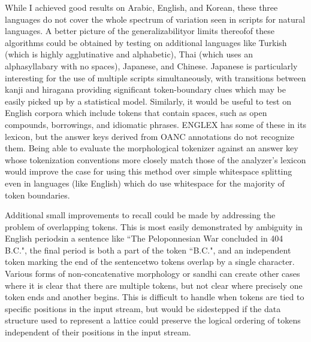 While I achieved good results on Arabic, English, and Korean, these three languages do not cover the whole spectrum of variation seen in scripts for natural languages. A better picture of the generalizability\textemdash or limits thereof\textemdash of these algorithms could be obtained by testing on additional languages like Turkish (which is highly agglutinative and alphabetic), Thai (which uses an alphasyllabary with no spaces), Japanese, and Chinese.
Japanese is particularly interesting for the use of multiple scripts simultaneously, with transitions between kanji and hiragana providing significant token-boundary clues which may be easily picked up by a statistical model. Similarly, it would be useful to test on English corpora which include tokens that contain spaces, such as open compounds, borrowings, and idiomatic phrases. ENGLEX has some of these in its lexicon, but the answer keys derived from OANC annotations do not recognize them. Being able to evaluate the morphological tokenizer against an answer key whose tokenization conventions more closely match those of the analyzer's lexicon would improve the case for using this method over simple whitespace splitting even in languages (like English) which do use whitespace for the majority of token boundaries.

Additional small improvements to recall could be made by addressing the problem of overlapping tokens. This is most easily demonstrated by ambiguity in English periods\textemdash in a sentence like ``The Peloponnesian War concluded in 404 B.C.", the final period is both a part of the token ``B.C.", and an independent token marking the end of the sentence\textemdash two tokens overlap by a single character. Various forms of non-concatenative morphology or sandhi can create other cases where it is clear that there are multiple tokens, but not clear where precisely one token ends and another begins. This is difficult to handle when tokens are tied to specific positions in the input stream, but would be sidestepped if the data structure used to represent a lattice could preserve the logical ordering of tokens independent of their positions in the input stream.

